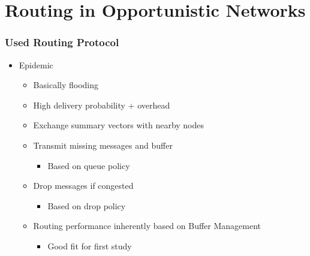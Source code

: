 \section{Routing in Opportunistic Networks}


\begin{frame}
  \frametitle{Used Routing Protocol}
  \begin{itemize}
    \item Epidemic
    \vspace{0.3cm}
    \begin{itemize}
      \item Basically flooding
      \vspace{0.1cm}
      \item High delivery probability + overhead
      \vspace{0.1cm}
      \item Exchange summary vectors with nearby nodes
      \vspace{0.1cm}
      \item Transmit missing messages and buffer
      \begin{itemize}
      	\item Based on queue policy
      \end{itemize}
      \vspace{0.1cm}
      \item Drop messages if congested
      \begin{itemize}
      	\item Based on drop policy
      \end{itemize}
      \vspace{0.1cm}
      \item Routing performance inherently based on Buffer Management
      \begin{itemize}
      	\item Good fit for first study
      \end{itemize}
    \end{itemize}
  \end{itemize}
\end{frame}



